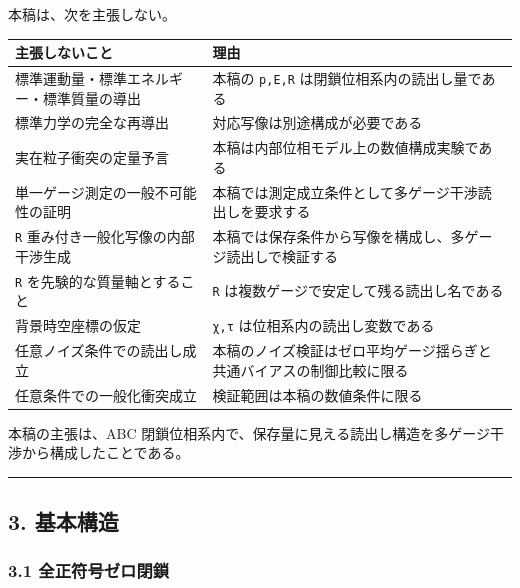 \documentclass[
  a4paper,
]{article}
\newcounter{none} %
\begin{document}
本稿は、次を主張しない。

{\def\LTcaptype{none} %
\begin{longtable}[]{@{}
  >{\raggedright\arraybackslash}p{}
  >{\raggedright\arraybackslash}p{}@{}}
\toprule\noalign{}
\begin{minipage}[b]{\linewidth}\raggedright
主張しないこと
\end{minipage} & \begin{minipage}[b]{\linewidth}\raggedright
理由
\end{minipage} \\
\midrule\noalign{}
\endhead
\bottomrule\noalign{}
\endlastfoot
標準運動量・標準エネルギー・標準質量の導出 & 本稿の \texttt{p,E,R}
は閉鎖位相系内の読出し量である \\
標準力学の完全な再導出 & 対応写像は別途構成が必要である \\
実在粒子衝突の定量予言 & 本稿は内部位相モデル上の数値構成実験である \\
単一ゲージ測定の一般不可能性の証明 &
本稿では測定成立条件として多ゲージ干渉読出しを要求する \\
\texttt{R} 重み付き一般化写像の内部干渉生成 &
本稿では保存条件から写像を構成し、多ゲージ読出しで検証する \\
\texttt{R} を先験的な質量軸とすること & \texttt{R}
は複数ゲージで安定して残る読出し名である \\
背景時空座標の仮定 & \texttt{χ,τ} は位相系内の読出し変数である \\
任意ノイズ条件での読出し成立 &
本稿のノイズ検証はゼロ平均ゲージ揺らぎと共通バイアスの制御比較に限る \\
任意条件での一般化衝突成立 & 検証範囲は本稿の数値条件に限る \\
\end{longtable}
}

本稿の主張は、ABC
閉鎖位相系内で、保存量に見える読出し構造を多ゲージ干渉から構成したことである。

\begin{center}\rule{0.5\linewidth}{0.5pt}\end{center}

\subsection{3. 基本構造}\label{ux57faux672cux69cbux9020}

\subsubsection{3.1
全正符号ゼロ閉鎖}\label{ux5168ux6b63ux7b26ux53f7ux30bcux30edux9589ux9396}
\end{document}
